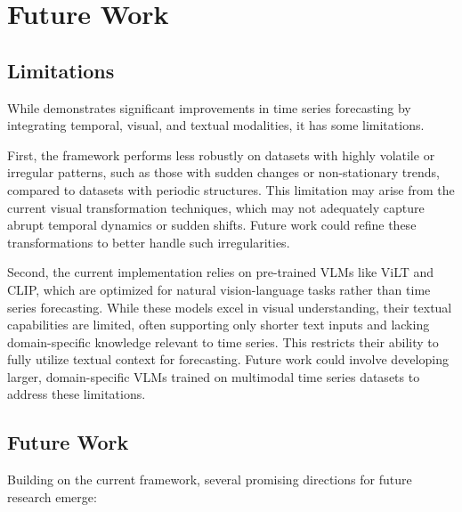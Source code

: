 \section{Future Work}
\label{appx:future_work}

\subsection{Limitations}

While \method demonstrates significant improvements in time series forecasting by integrating temporal, visual, and textual modalities, it has some limitations.

First, the framework performs less robustly on datasets with highly volatile or irregular patterns, such as those with sudden changes or non-stationary trends, compared to datasets with periodic structures. This limitation may arise from the current visual transformation techniques, which may not adequately capture abrupt temporal dynamics or sudden shifts. Future work could refine these transformations to better handle such irregularities.

Second, the current implementation relies on pre-trained VLMs like ViLT and CLIP, which are optimized for natural vision-language tasks rather than time series forecasting. While these models excel in visual understanding, their textual capabilities are limited, often supporting only shorter text inputs and lacking domain-specific knowledge relevant to time series. This restricts their ability to fully utilize textual context for forecasting. Future work could involve developing larger, domain-specific VLMs trained on multimodal time series datasets to address these limitations.

\subsection{Future Work}

Building on the current framework, several promising directions for future research emerge:


